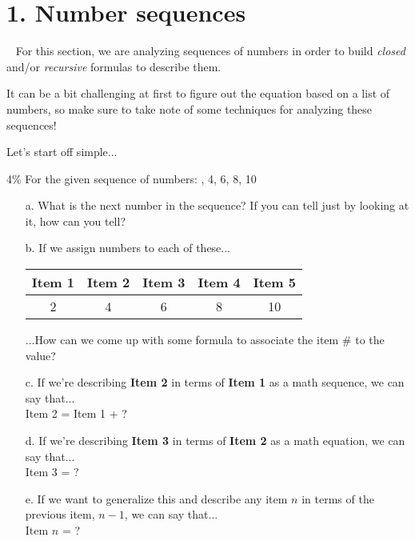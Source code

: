 \documentclass[a4paper,12pt]{book}
\begin{document}
    \section*{1. Number sequences}

        \begin{intro}{\ }
            For this section, we are analyzing sequences of numbers in order to build
            \textit{closed} and/or \textit{recursive} formulas to describe them.

            It can be a bit challenging at first to figure out the equation based
            on a list of numbers, so make sure to take note of some techniques for analyzing
            these sequences!

            Let's start off simple...
        \end{intro}

        \begin{question}{1}{4\%}
            For the given sequence of numbers: , 4, 6, 8, 10
        \end{question}

        \begin{enumerate}
            \item[a.] What is the next number in the sequence?  If you can tell just by looking at it, how can you tell?

            \item[b.] If we assign numbers to each of these...

            \begin{center}
                \begin{tabular}{ | c | c | c | c | c | }
                    \hline{}
                    Item 1 & Item 2 & Item 3 & Item 4 & Item 5 \\ \hline
                    2 & 4 & 6 & 8 & 10 \\ \hline
                \end{tabular}
            \end{center}

            ...How can we come up with some formula to associate the item \# to the value?

            \item[c.] If we're describing \textbf{Item 2} in terms of \textbf{Item 1} as
                a math sequence, we can say that... \\
                Item 2 = Item 1 + ?

            \item[d.] If we're describing \textbf{Item 3} in terms of \textbf{Item 2} as a math
                equation, we can say that... \\
                Item 3 = ?

            \item[e.] If we want to generalize this and describe any item $n$ in terms of
                the previous item, $n-1$, we can say that... \\
                Item $n$ = ?
        \end{enumerate}
\end{document}
